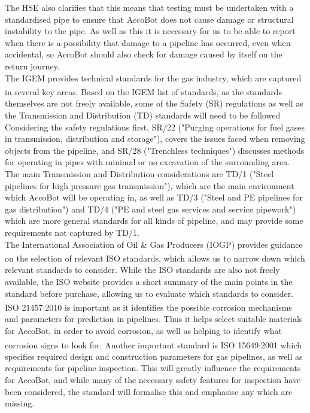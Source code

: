 \documentclass[11pt]{article}		%
\newcommand{\supercite}[1]{\textsuperscript{\cite{#1}}}		%
\begin{document}
			The HSE also clarifies that this means that testing must be undertaken with a standardised pipe to ensure that AccoBot does not cause damage or structural instability to the pipe.
			As well as this it is necessary for us to be able to report when there is a possibility that damage to a pipeline has occurred, even when accidental, so AccoBot should also check for damage caused by itself on the return journey.
			\\
			The IGEM provides technical standards for the gas industry, which are captured in several key areas.
			Based on the IGEM list of standards\supercite{institution2021igem}, as the standards themselves are not freely available, some of the Safety (SR) regulations  as well as the Transmission and Distribution (TD) standards will need to be followed
			Considering the safety regulations first, SR/22 ("Purging operations for fuel gases in transmission, distribution and storage"), covers the issues faced when removing objects from the pipeline, and SR/28 ("Trenchless techniques") discusses methods for operating in pipes with minimal or no excavation of the surrounding area.
			The main Transmission and Distribution considerations are TD/1 ("Steel pipelines for high pressure gas transmission"), which are the main environment which AccoBot will be operating in, as well as TD/3 ("Steel and PE pipelines for gas distribution") and TD/4 ("PE and steel gas services and service pipework") which are more general standards for all kinds of pipeline, and may provide some requirements not captured by TD/1.
			\\
			The International Association of Oil \& Gas Producers (IOGP) provides guidance on the selection of relevant ISO standards\supercite{iogp2017standards}, which allows us to narrow down which relevant standards to consider.
			While the ISO standards are also not freely available, the ISO website provides a short summary of the main points in the standard before purchase, allowing us to evaluate which standards to consider.
			ISO 21457:2010\supercite{iso21457} is important as it identifies the possible corrosion mechanisms and parameters for prediction in pipelines.
			Thus it helps select suitable materials for AccoBot, in order to avoid corrosion, as well as helping to identify what corrosion signs to look for.
			Another important standard is ISO 15649:2001\supercite{iso15649} which specifies required design and construction parameters for gas pipelines, as well as requirements for pipeline inspection.
			This will greatly influence the requirements for AccoBot, and while many of the necessary safety features for inspection have been considered, the standard will formalise this and emphasise any which are missing.
		
\end{document}
